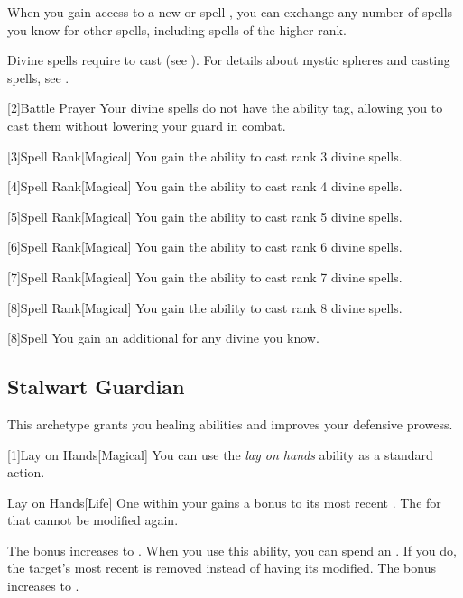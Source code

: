         When you gain access to a new  or spell ,
            you can exchange any number of spells you know for other spells,
            including spells of the higher rank.

        Divine spells require  to cast (see ).
        For details about mystic spheres and casting spells, see .

        [2]{Battle Prayer} Your divine spells do not have the  ability tag, allowing you to cast them without lowering your guard in combat.

        [3]{Spell Rank}[Magical] You gain the ability to cast rank 3 divine spells.

        [4]{Spell Rank}[Magical] You gain the ability to cast rank 4 divine spells.

        [5]{Spell Rank}[Magical] You gain the ability to cast rank 5 divine spells.

        [6]{Spell Rank}[Magical] You gain the ability to cast rank 6 divine spells.

        [7]{Spell Rank}[Magical] You gain the ability to cast rank 7 divine spells.

        [8]{Spell Rank}[Magical] You gain the ability to cast rank 8 divine spells.

        [8]{Spell} You gain an additional  for any divine  you know.

    \subsection{Stalwart Guardian}
        This archetype grants you healing abilities and improves your defensive prowess.

        [1]{Lay on Hands}[Magical] You can use the \textit{lay on hands} ability as a standard action.
        \begin{freeability}{Lay on Hands}[Life]
            One  within your  gains a  bonus to its most recent .
            The  for that  cannot be modified again.

            \rankline
             The bonus increases to .
             When you use this ability, you can spend an .
            If you do, the target's most recent  is removed instead of having its  modified.
             The bonus increases to .
        \end{freeability}

